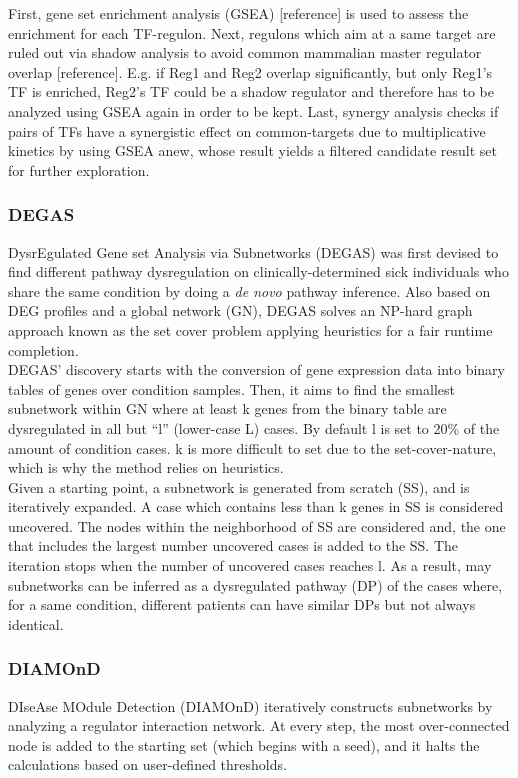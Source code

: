 First, gene set enrichment analysis (GSEA) [reference] is used to assess the enrichment for each TF-regulon. Next, regulons which aim at a same target are ruled out via shadow analysis to avoid common mammalian master regulator overlap [reference]. E.g. if  Reg1 and Reg2 overlap significantly, but only Reg1's TF is enriched, Reg2’s TF could be a shadow regulator and therefore has to be analyzed using GSEA again in order to be kept.
Last, synergy analysis checks if pairs of TFs have a synergistic effect on common-targets due to multiplicative kinetics by using GSEA anew, whose result yields a filtered candidate result set for further exploration.

\subsubsection{DEGAS}
DysrEgulated Gene set Analysis via Subnetworks (DEGAS) \cite{Ulitsky2010DEGAS:Diseases} was first devised to find different pathway dysregulation on clinically-determined sick individuals who share the same condition by doing a \textit{de novo} pathway inference. Also based on DEG profiles and a global network (GN), DEGAS solves an NP-hard graph approach known as the set cover problem applying heuristics for a fair runtime completion.
\\

DEGAS’ discovery starts with the conversion of gene expression data into binary tables of genes over condition samples. Then, it aims to find the smallest subnetwork within GN where at least k genes from the binary table are dysregulated in all but “l” (lower-case L) cases. By default l is set to 20\% of the amount of condition cases. k is more difficult to set due to the set-cover-nature, which is why the method relies on heuristics. 
\\

Given a starting point, a subnetwork is generated from scratch (SS), and is iteratively expanded. A case which contains less than k genes in SS is considered uncovered. The nodes within the neighborhood of SS are considered and, the one that includes the largest number uncovered cases is added to the SS. The iteration stops when the number of uncovered cases reaches l. As a result, may subnetworks can be inferred as a dysregulated pathway (DP) of the cases where, for a same condition, different patients can have similar DPs but not always identical.

\subsubsection{DIAMOnD}
DIseAse MOdule Detection (DIAMOnD) \cite{Ghiassian2015AInteractome} iteratively constructs subnetworks by analyzing a regulator interaction network. At every step, the most over-connected node is added to the starting set (which begins with a seed), and it halts the calculations based on user-defined thresholds.
\\


